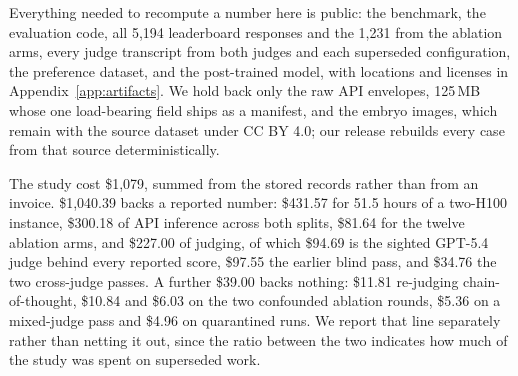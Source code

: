 Everything needed to recompute a number here is public: the benchmark, the
evaluation code, all 5,194 leaderboard responses and the 1,231 from the ablation
arms, every judge transcript from both judges and each superseded configuration,
the preference dataset, and the post-trained model, with locations and licenses
in Appendix~\ref{app:artifacts}. We hold back only the raw API envelopes, 125\,MB
whose one load-bearing field ships as a manifest, and the embryo images, which
remain with the source dataset \citep{kromp2023} under CC BY 4.0; our release
rebuilds every case from that source deterministically.

The study cost \$1,079, summed from the stored records rather than from an
invoice. \$1,040.39 backs a reported number: \$431.57 for 51.5 hours of a two-H100
instance, \$300.18 of API inference across both splits, \$81.64 for the twelve
ablation arms, and \$227.00 of judging, of which \$94.69 is the sighted GPT-5.4
judge behind every reported score, \$97.55 the earlier blind pass, and \$34.76 the
two cross-judge passes. A further \$39.00 backs nothing: \$11.81 re-judging
chain-of-thought, \$10.84 and \$6.03 on the two confounded ablation rounds, \$5.36
on a mixed-judge pass and \$4.96 on quarantined runs. We report that line
separately rather than netting it out, since the ratio between the two indicates
how much of the study was spent on superseded work.
